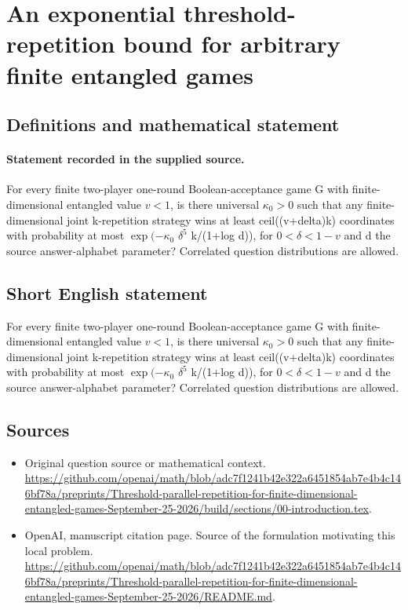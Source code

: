 \documentclass[11pt]{article}
\begin{document}
\section*{An exponential threshold-repetition bound for arbitrary finite entangled games}\label{30007219}
\subsection{Definitions and mathematical statement}
\paragraph{Statement recorded in the supplied source.}
For every finite two-player one-round Boolean-acceptance game G with finite-dimensional entangled value $v<1$, is there universal $\kappa _0>0$ such that any finite-dimensional joint k-repetition strategy wins at least ceil((v+delta)k) coordinates with probability at most $\exp (-\kappa _0$ $\delta ^5$ k/(1+log d)), for $0<\delta <1-v$ and d the source answer-alphabet parameter? Correlated question distributions are allowed.
\subsection{Short English statement}
For every finite two-player one-round Boolean-acceptance game G with finite-dimensional entangled value $v<1$, is there universal $\kappa _0>0$ such that any finite-dimensional joint k-repetition strategy wins at least ceil((v+delta)k) coordinates with probability at most $\exp (-\kappa _0$ $\delta ^5$ k/(1+log d)), for $0<\delta <1-v$ and d the source answer-alphabet parameter? Correlated question distributions are allowed.
\subsection{Sources}
\begin{itemize}
\item[S1] Original question source or mathematical context.
\url{https://github.com/openai/math/blob/adc7f1241b42e322a6451854ab7e4b4c146bf78a/preprints/Threshold-parallel-repetition-for-finite-dimensional-entangled-games-September-25-2026/build/sections/00-introduction.tex}.
\item[S2] OpenAI, manuscript citation page. Source of the formulation motivating this local problem.
\url{https://github.com/openai/math/blob/adc7f1241b42e322a6451854ab7e4b4c146bf78a/preprints/Threshold-parallel-repetition-for-finite-dimensional-entangled-games-September-25-2026/README.md}.
\end{itemize}
\end{document}
